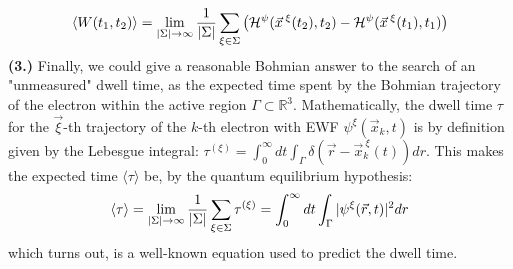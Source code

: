 \documentclass[11pt, a4paper]{article} %
\newcommand{\R}{\mathbb{R}} %
\begin{document}
\begin{equation}
\langle W(t_1,t_2)\rangle = \lim_{|\Sigma|\rightarrow \infty}\frac{1}{|\Sigma|} \sum_{\xi\in\Sigma} \qty(\mathcal{H}^\psi(\vec{x}^{\:\xi}(t_2),t_2)-\mathcal{H}^\psi(\vec{x}^{\:\xi}(t_1),t_1))
\end{equation}
{\bf (3.) }Finally, we could give a reasonable Bohmian answer to the search of an "unmeasured" dwell time, as the expected time spent by the Bohmian trajectory of the electron within the active region $\Gamma\subset \R^3$. Mathematically, the dwell time $\tau$ for the $\vec{\xi}$-th trajectory of the $k$-th electron with EWF $\psi^\xi(\vec{x}_k,t)$ is by definition given by the Lebesgue integral: $\tau^{( \xi)}= \int_{0}^\infty  dt \int_\Gamma \delta(\vec{r}-\vec{x}_k^{\:\xi}(t)) dr$. This makes the expected time $\langle \tau\rangle$ be, by the quantum equilibrium hypothesis:\vspace{-0.15cm}
\begin{equation}
\langle \tau \rangle = \lim_{|\Sigma|\rightarrow \infty}\frac{1}{|\Sigma|} \sum_{\xi\in\Sigma} \tau^{(\xi)} = \int_{0}^\infty dt \int_\Gamma |\psi^\xi(\vec{r},t)|^2dr\vspace{-0.15cm}
\end{equation}
which turns out, is a well-known equation used to predict the dwell time.\vspace{-0.2cm}
\end{document}
